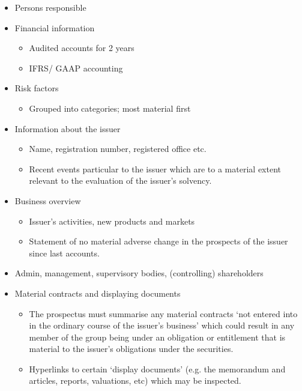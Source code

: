 \documentclass[
]{article}
\providecommand{\tightlist}{%
  \setlength{\itemsep}{0pt}\setlength{\parskip}{0pt}}
\begin{document}
\begin{itemize}
\tightlist
\item
  Persons responsible
\item
  Financial information

  \begin{itemize}
  \tightlist
  \item
    Audited accounts for 2 years
  \item
    IFRS/ GAAP accounting
  \end{itemize}
\item
  Risk factors

  \begin{itemize}
  \tightlist
  \item
    Grouped into categories; most material first
  \end{itemize}
\item
  Information about the issuer

  \begin{itemize}
  \tightlist
  \item
    Name, registration number, registered office etc.
  \item
    Recent events particular to the issuer which are to a material
    extent relevant to the evaluation of the issuer's solvency.
  \end{itemize}
\item
  Business overview

  \begin{itemize}
  \tightlist
  \item
    Issuer's activities, new products and markets
  \item
    Statement of no material adverse change in the prospects of the
    issuer since last accounts.
  \end{itemize}
\item
  Admin, management, supervisory bodies, (controlling) shareholders
\item
  Material contracts and displaying documents

  \begin{itemize}
  \tightlist
  \item
    The prospectus must summarise any material contracts `not entered
    into in the ordinary course of the issuer's business' which could
    result in any member of the group being under an obligation or
    entitlement that is material to the issuer's obligations under the
    securities.
  \item
    Hyperlinks to certain `display documents' (e.g. the memorandum and
    articles, reports, valuations, etc) which may be inspected.
  \end{itemize}
\end{itemize}
\end{document}
